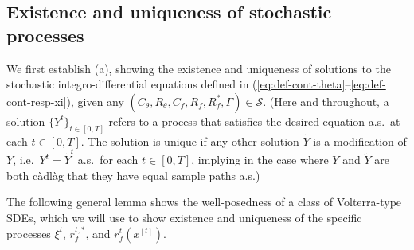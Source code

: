 \documentclass[11pt,letterpaper,reqno]{amsart}
\theoremstyle{definition}
\def\cS{\mathcal{S}}
\begin{document}
\subsection{Existence and uniqueness of stochastic processes}
We first establish (a), showing
the existence and uniqueness of solutions to the
stochastic integro-differential equations defined in
(\ref{eq:def-cont-theta}--\ref{eq:def-cont-resp-xi}), given any
$(C_\theta,R_\theta,C_f,R_f,R_f^*,\Gamma) \in \cS$. (Here
and throughout, a solution $\{Y^t\}_{t \in [0,T]}$ refers to a process that
satisfies the desired equation a.s.\ at each $t \in [0,T]$.
The solution is unique if any other solution $\widetilde Y$ is a modification of $Y$, i.e.\ $Y^t=\widetilde Y^t$ a.s.\ for each $t \in [0,T]$, implying in the case where $Y$ and $\widetilde Y$ are both c\`adl\`ag that they have equal sample paths a.s.)

The following general lemma shows the well-posedness of a class of
Volterra-type SDEs, which we will use to show existence and uniqueness
of the specific processes $\xi^t$, $r_f^{t,*}$, and $r_f^t(x^{[t]})$. 
\end{document}
